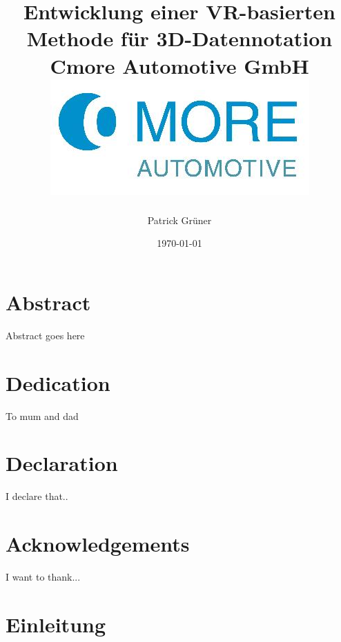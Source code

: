 \documentclass[12pt]{scrreprt}
\begin{document}
\onehalfspacing


\title{
	{Entwicklung einer VR-basierten Methode für 3D-Datennotation}\\
	{\large Cmore Automotive GmbH}\\
	{\includegraphics{Main_Images/cmoreLogo}}
}
\author{Patrick Grüner}
\date{\today}
\maketitle

\tableofcontents

\newpage
\chapter*{Abstract}
Abstract goes here

\chapter*{Dedication}
To mum and dad

\chapter*{Declaration}
I declare that..

\chapter*{Acknowledgements}
I want to thank...
\newpage

\newpage
\printnoidxglossary[style=altlist,title=Glossar]

\newpage
{}
\printnoidxglossary[type=\acronymtype,style=long]

\newpage
\printnoidxglossary[type=symbolslist,style=long]

\newpage

\chapter{Einleitung}

\end{document}
